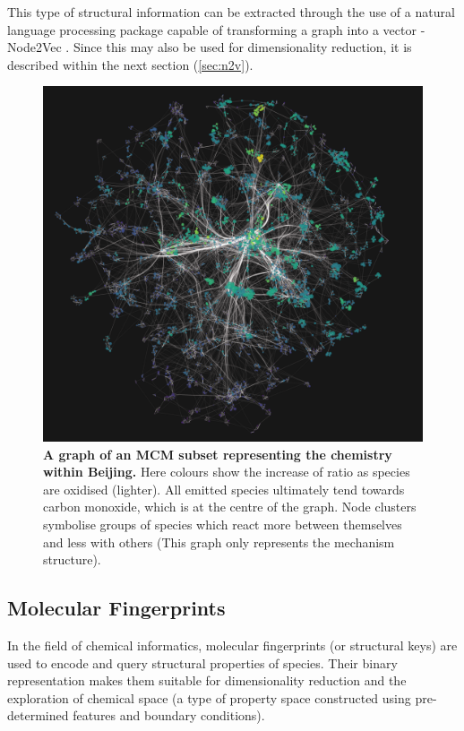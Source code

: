 This type of structural information can be extracted through the use of a natural language processing package capable of transforming a graph into a vector - Node2Vec \citep{node2vec}. Since this may also be used for dimensionality reduction, it is described within the next section (\autoref{sec:n2v}).


\begin{figure}[H]
  \centering
  \includegraphics[width=\textwidth]{4fig/graph/oxidised_ratio.png}
  \caption{\textbf{A graph of an MCM subset representing the chemistry within Beijing.} Here colours show the increase of  ratio as species are oxidised (lighter). All emitted species ultimately tend towards carbon monoxide, which is at the centre of the graph. Node clusters symbolise groups of species which react more between themselves and less with others (This graph only represents the mechanism structure).}
  \label{fig:vk}
\end{figure}





\subsection{Molecular Fingerprints}\label{sec:fingerprints}

In the field of chemical informatics, molecular fingerprints (or structural keys) are used to encode and query structural properties of species. Their binary representation makes them suitable for dimensionality reduction and the exploration of chemical space (a type of property space constructed using pre-determined features and boundary conditions).

